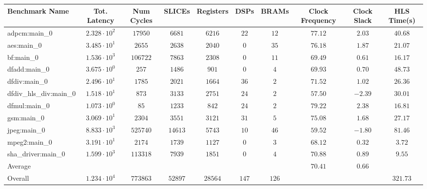 \begin{tabular}{|l|c|c|c|c|c|c|c|c|c|}
\hline
Benchmark Name          & Tot. Latency           & Num Cycles & SLICEs    & Registers & DSPs    & BRAMs   & Clock Frequency & Clock Slack & HLS Time(s) \\
\hline
adpcm:main\_0           & $ 2.328 \cdot 10^{2} $ & $ 17950  $ & $ 6681  $ & $ 6216  $ & $ 22  $ & $ 12  $ & $ 77.12       $ & $ 2.03    $ & $ 40.68   $ \\
aes:main\_0             & $ 3.485 \cdot 10^{1} $ & $ 2655   $ & $ 2638  $ & $ 2040  $ & $ 0   $ & $ 35  $ & $ 76.18       $ & $ 1.87    $ & $ 21.07   $ \\
bf:main\_0              & $ 1.536 \cdot 10^{3} $ & $ 106722 $ & $ 7863  $ & $ 2308  $ & $ 0   $ & $ 11  $ & $ 69.49       $ & $ 0.61    $ & $ 16.17   $ \\
dfadd:main\_0           & $ 3.675 \cdot 10^{0} $ & $ 257    $ & $ 1486  $ & $ 901   $ & $ 0   $ & $ 4   $ & $ 69.93       $ & $ 0.70    $ & $ 48.73   $ \\
dfdiv:main\_0           & $ 2.496 \cdot 10^{1} $ & $ 1785   $ & $ 2021  $ & $ 1664  $ & $ 36  $ & $ 2   $ & $ 71.52       $ & $ 1.02    $ & $ 26.36   $ \\
dfdiv\_hls\_div:main\_0 & $ 1.518 \cdot 10^{1} $ & $ 873    $ & $ 3133  $ & $ 2751  $ & $ 24  $ & $ 2   $ & $ 57.50       $ & $ -2.39   $ & $ 30.01   $ \\
dfmul:main\_0           & $ 1.073 \cdot 10^{0} $ & $ 85     $ & $ 1233  $ & $ 842   $ & $ 24  $ & $ 2   $ & $ 79.22       $ & $ 2.38    $ & $ 16.81   $ \\
gsm:main\_0             & $ 3.069 \cdot 10^{1} $ & $ 2304   $ & $ 3551  $ & $ 3121  $ & $ 31  $ & $ 5   $ & $ 75.08       $ & $ 1.68    $ & $ 27.17   $ \\
jpeg:main\_0            & $ 8.833 \cdot 10^{3} $ & $ 525740 $ & $ 14613 $ & $ 5743  $ & $ 10  $ & $ 46  $ & $ 59.52       $ & $ -1.80   $ & $ 81.46   $ \\
mpeg2:main\_0           & $ 3.191 \cdot 10^{1} $ & $ 2174   $ & $ 1739  $ & $ 1127  $ & $ 0   $ & $ 3   $ & $ 68.12       $ & $ 0.32    $ & $ 3.72    $ \\
sha\_driver:main\_0     & $ 1.599 \cdot 10^{3} $ & $ 113318 $ & $ 7939  $ & $ 1851  $ & $ 0   $ & $ 4   $ & $ 70.88       $ & $ 0.89    $ & $ 9.55    $ \\
\hline
Average                 & $                    $ & $        $ & $       $ & $       $ & $     $ & $     $ & $ 70.41       $ & $ 0.66    $ & $         $ \\
\hline
Overall                 & $ 1.234 \cdot 10^{4} $ & $ 773863 $ & $ 52897 $ & $ 28564 $ & $ 147 $ & $ 126 $ & $             $ & $         $ & $ 321.73  $ \\
\hline
\end{tabular}

